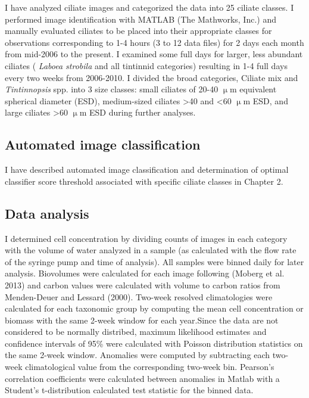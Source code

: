 I have analyzed ciliate images and categorized the data into 25 ciliate classes. I performed image identification with MATLAB (The Mathworks, Inc.) and manually evaluated ciliates to be placed into their appropriate classes for observations corresponding to 1-4 hours (3 to 12 data files) for 2 days each month from mid-2006 to the present. I examined some full days for larger, less abundant ciliates  ( \textit{Laboea strobila} and all tintinnid categories) resulting in 1-4 full days every two weeks from 2006-2010. I divided the broad categories, Ciliate mix and \textit{Tintinnopsis} spp. into 3 size classes: small ciliates of 20-40 $\upmu$m equivalent spherical diameter (ESD), medium-sized ciliates >40 and <60 $\upmu$m ESD, and large
ciliates >60 $\upmu$m ESD during further analyses. 

\subsection{Automated image classification}

I have described automated image classification and determination of optimal classifier score threshold associated with specific ciliate classes in Chapter 2.

\subsection{Data analysis}

I determined cell concentration by dividing counts of images in each category with the volume of water analyzed in a sample (as calculated with the flow rate of the syringe pump and time of analysis). All samples were binned daily for later analysis. Biovolumes were calculated for each image following (Moberg et al. 2013) and carbon values were calculated with volume to carbon ratios from Menden-Deuer and Lessard (2000). Two-week resolved climatologies were calculated for each taxonomic group by computing the mean cell concentration or biomass with the same 2-week window for each year.Since the data are not considered to be normally distribed, maximum likelihood estimates and confidence intervals of 95\% were calculated with Poisson distribution statistics on the same 2-week window. Anomalies were computed by subtracting each two-week climatological value from the corresponding two-week bin. Pearson's correlation coefficients were calculated between anomalies in Matlab with a Student's t-distribution calculated test statistic for the binned data.

   



